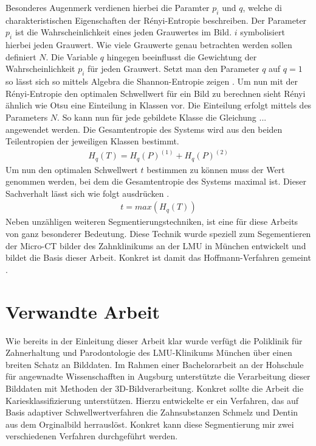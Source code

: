 Besonderes Augenmerk verdienen hierbei die Paramter $p_{i}$ und $q$, welche di charakteristischen
Eigenschaften der Rényi-Entropie beschreiben. Der Parameter $p_{i}$ ist die
Wahrscheinlichkeit eines jeden Grauwertes im Bild. $i$ symbolisiert hierbei jeden
Grauwert. Wie viele Grauwerte genau betrachten werden sollen definiert $N$. Die Variable
$q$ hingegen beeinflusst die Gewichtung der Wahrscheinlichkeit $p_{i}$ für jeden
Grauwert. Setzt man den Parameter $q$ auf $q = 1$ so lässt sich so mittels
Algebra die Shannon-Entropie zeigen \citep[vgl.][K.2]{bromiley2004}. Um nun mit
der Rényi-Entropie den optimalen Schwellwert für ein Bild zu berechnen sieht
Rényi ähnlich wie Otsu eine Einteilung in Klassen vor. Die Einteilung erfolgt mittels
des Parameters $N$. So kann nun für jede gebildete Klasse die Gleichung ...
angewendet werden. Die Gesamtentropie des Systems wird aus den beiden Teilentropien
der jeweiligen Klassen bestimmt\citep[vgl.][K. 2]{bromiley2004}.
\begin{align}
	H_{q}(T) = H_{q}(P)^{(1)}+ H_{q}(P)^{(2)}
\end{align}
Um nun den optimalen Schwellwert $t$ bestimmen zu können muss der Wert genommen
werden, bei dem die Gesamtentropie des Systems maximal ist. Dieser Sachverhalt
lässt sich wie folgt ausdrücken \citep[vgl.][K. 2]{bromiley2004}.
\begin{align}
	t = max(H_{q}(T))
\end{align}
Neben unzähligen weiteren Segmentierungstechniken, ist eine für diese Arbeits von
ganz besonderer Bedeutung. Diese Technik wurde speziell zum Segementieren der
Micro-CT bilder des Zahnklinikums an der LMU in München entwickelt und bildet
die Basis dieser Arbeit. Konkret ist damit das Hoffmann-Verfahren gemeint \citep[vgl.][]{hoffmann2020}.

\pagebreak

\section{Verwandte Arbeit}
\label{sec:verwwandte_arbeit} Wie bereits in der Einleitung dieser Arbeit klar wurde
verfügt die Poliklinik für Zahnerhaltung und Parodontologie des LMU-Klinikums München
über einen breiten Schatz an Bilddaten. Im Rahmen einer Bachelorarbeit an der
Hohschule für angewnadte Wissenschafften in Augsburg unterstützte \citet{hoffmann2020}
die Verarbeitung dieser Bilddaten mit Methoden der 3D-Bildverarbeitung. Konkret
sollte die Arbeit die Kariesklassifizierung unterstützen. Hierzu entwickelte er ein
Verfahren, das auf Basis adaptiver Schwellwertverfahren die Zahnsubstanzen
Schmelz und Dentin aus dem Orginalbild herrauslöst. Konkret kann diese Segmentierung
mir zwei verschiedenen Verfahren durchgeführt werden.

